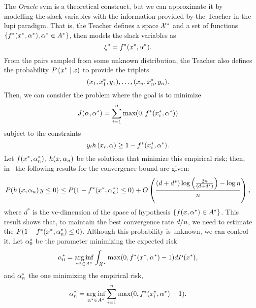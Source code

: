 The \emph{Oracle} \acrshort{svm} is a theoretical construct, but we can approximate it by modelling the slack variables with the information provided by the Teacher in the \acrshort{lupi} paradigm.
That is, the Teacher defines a space $\mathcal{X}^*$ and a set of functions $\left\{f^*(x^*, \alpha^*) , \alpha^* \in A^*\right\}$, then models the slack variables as
\begin{equation}
    \nonumber
    \xi^* = f^*(x^*, \alpha^*) .
\end{equation}
From the pairs sampled from some unknown distribution, the Teacher also defines the probability $P\left( x^* \;\middle\vert\; x \right)$ to provide the triplets
\begin{equation}
    \nonumber
    (x_1, x^*_1, y_1), \ldots, (x_n, x^*_n, y_n) .
\end{equation}
Then, we can consider the problem where the goal is to minimize
$$ J(\alpha, \alpha^*) = \sum_{i=1}^n \max(0, f^*(x_i^*, \alpha^*)) $$
subject to the constraints
$$ y_i h\left(x_i, \alpha\right) \geq 1 - f^*(x_i^*, \alpha^*).$$
Let $f(x^*, \alpha^*_n),\; h(x, \alpha_n)$ be the solutions that minimize this empirical risk; then, in~\citet[Proposition~2]{VapnikV09} the following results for the convergence bound are given:
\begin{equation}
    \nonumber
    P(h\left(x, \alpha_n\right) y \leq 0) \leq P(1 - f^*(x^*, \alpha^*_n) \leq 0) + O\left( \frac{(d + d^*) \log\left(\frac{2n}{(d + d^*)} \right) - \log\eta}{n}  \right) ,
\end{equation}
where $d^*$ is the \acrshort{vc}-dimension of the space of hypothesis $\left\{f(x, \alpha^*) \in A^*\right\}$. This result shows that, to maintain the best convergence rate $d/n$, we need to estimate the $P(1 - f^*(x^*, \alpha^*_n) \leq 0)$. Although this probability is unknown,  we can control it. Let $\alpha^*_0$ be the parameter minimizing the expected risk
\begin{equation}
    \nonumber
    \alpha^*_0 = \operatorname*{arg\inf}_{\alpha^* \in A^*} \int_{\mathcal{X}^*} \max(0, f^*(x^*, \alpha^*)- 1) dP(x^*) ,
\end{equation}
and $\alpha^*_n$ the one minimizing the empirical risk,
\begin{equation}
    \nonumber
    \alpha^*_n = \operatorname*{arg\inf}_{\alpha^* \in A^*} \sum_{i=1}^n \max(0, f^*(x^*_i, \alpha^*)- 1) .
\end{equation}

